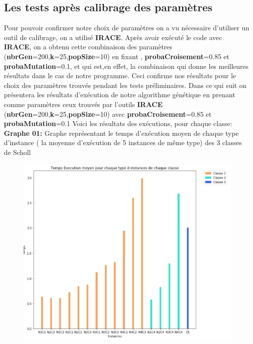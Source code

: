 \documentclass{article}
\begin{document}
\subsection{Les tests après calibrage des paramètres}
Pour pouvoir confirmer notre choix de paramètres on a vu nécessaire d’utiliser un outil de calibrage, on a utilisé \textbf{IRACE}. 
\newline
Après avoir exécuté le code avec \textbf{IRACE}, on a obtenu cette combinaison des paramètres (\textbf{nbrGen}=200,\textbf{k}=25,\textbf{popSize}=10) en fixant , \textbf{probaCroisement}=0.85 et \textbf{probaMutation}=0.1, et qui est,en effet, la combinaison qui donne les meilleures résultats dans le cas de notre programme. Ceci confirme nos résultats pour le choix des paramètres trouvés pendant les tests préliminaires.
\newline
\newline
Dans ce qui suit on présentera les résultats d’exécution de notre algorithme génétique en prenant comme paramètres ceux trouvés par l’outils \textbf{IRACE} (\textbf{nbrGen}=200,\textbf{k}=25,\textbf{popSize}=10) avec \textbf{probaCroisement}=0.85 et \textbf{probaMutation}=0.1
\newline
Voici les résultats des exécutions, pour chaque classe:
\newline
\textbf{Graphe 01:}
Graphe représentant le temps d'exécution moyen de chaque type d’instance ( la moyenne d'exécution de 5 instances de même type) des 3 classes de Scholl
\begin{figure}[H]
  \includegraphics[width=\linewidth]{../figures/pic07.PNG}
\end{figure}
\end{document}

